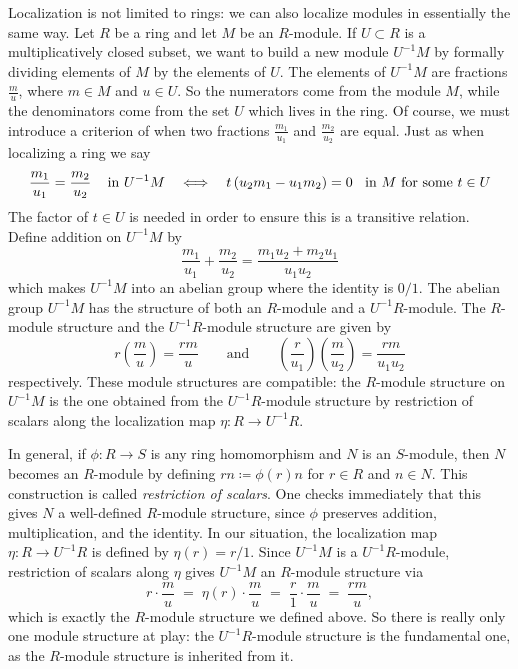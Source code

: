 \documentclass[12pt,reqno]{amsart}
\begin{document}
Localization is not limited to rings: we can also localize modules in essentially the same way. Let $R$ be a ring and let $M$ be an $R$-module. If $U \subset R$ is a multiplicatively closed subset, we want to build a new module $U^{-1}M$ by formally dividing elements of $M$ by the elements of $U$. The elements of $U^{-1}M$ are fractions $\frac{m}{u}$, where $m\in M$ and $u\in U$. So the numerators come from the module $M$, while the denominators come from the set $U$ which lives in the ring.  Of course, we must introduce a criterion of when two fractions $\frac{m_1}{u_1}$ and $\frac{m_2}{u_2}$ are equal. Just as when localizing a ring we say 
\[
\frac{m_{1}}{u_1}=\frac{m_2}{u_2} \text{\;\;\; in $U^{-1}M$} 
\quad \Longleftrightarrow \quad
t\left(u_{2}m_{1}-u_{1}m_{2}\right) = 0 \text{\;\; in $M$ for some $t\in U$}
\]
The factor of $t \in U$ is needed in order to ensure this is a transitive relation. Define addition on $U^{-1}M$ by
\[
\frac{m_1}{u_1}+\frac{m_2}{u_2} = \frac{m_1u_{2}+m_{2}u_{1}}{u_1u_2}
\]
which makes $U^{-1}M$ into an abelian group where the identity is $0/1$. The abelian group $U^{-1}M$ has the structure of both an $R$-module and a $U^{-1}R$-module. The $R$-module structure and the $U^{-1}R$-module structure are given by
\[
r \left(\frac{m}{u}\right)=\frac{rm}{u} \quad \quad \text{and} \quad \quad
\left(\frac{r}{u_1}\right)\left(\frac{m}{u_2}\right)=\frac{rm}{u_1u_2}
\]
respectively. These module structures are compatible: the $R$-module structure on $U^{-1}M$ is the one obtained from the $U^{-1}R$-module structure by restriction of scalars along the localization map $\eta:R\to U^{-1}R$. 

In general, if $\phi: R\to S$ is any ring homomorphism and $N$ is an $S$-module, then $N$ becomes an $R$-module by defining $rn \coloneqq \phi(r)n$ for $r\in R$ and $n\in N$. This construction is called \emph{restriction of scalars}. One checks immediately that this gives $N$ a well-defined $R$-module structure, since $\phi$ preserves addition, multiplication, and the identity. In our situation, the localization map $\eta: R\to U^{-1}R$ is defined by $\eta(r)=r/1$. Since $U^{-1}M$ is a $U^{-1}R$-module, restriction of scalars along $\eta$ gives $U^{-1}M$ an $R$-module structure via
\[
r\cdot \frac{m}{u} \;=\; \eta(r)\cdot\frac{m}{u} \;=\; \frac{r}{1}\cdot\frac{m}{u} \;=\; \frac{rm}{u},
\]
which is exactly the $R$-module structure we defined above. So there is really only one module structure at play: the $U^{-1}R$-module structure is the fundamental one, as the $R$-module structure is inherited from it.
 
\end{document}
